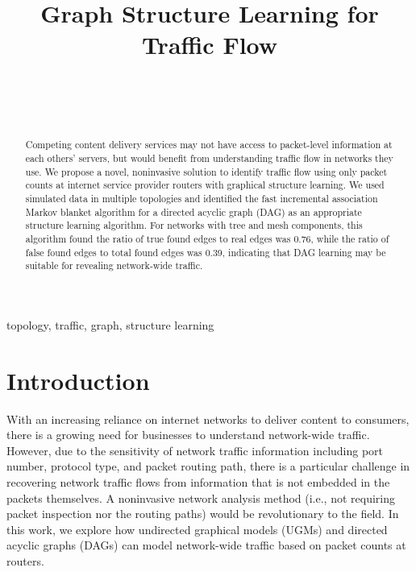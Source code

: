 \documentclass[conference]{IEEEtran}
\begin{document}
\title{Graph Structure Learning for Traffic Flow} 
\author{
\\[-9.0ex]
\and
{}
\\[-9.0ex]
}
\maketitle
\begin{abstract}
Competing content delivery services may not have access to packet-level information at each others' servers, but would benefit from understanding traffic flow in networks they use. We propose a novel, noninvasive solution to identify traffic flow using only packet counts at internet service provider routers with graphical structure learning. We used simulated data in multiple topologies and identified the fast incremental association Markov blanket algorithm for a directed acyclic graph (DAG) as an appropriate structure learning algorithm. For networks with tree and mesh components, this algorithm found the ratio of true found edges to real edges was 0.76, while the ratio of false found edges to total found edges was 0.39, indicating that DAG learning may be suitable for revealing network-wide traffic.

\end{abstract}

\begin{IEEEkeywords}
topology, traffic, graph, structure learning 
\end{IEEEkeywords}

\section{Introduction}
With an increasing reliance on internet networks to deliver content to consumers, there is a growing need for businesses to understand network-wide traffic. However, due to the sensitivity of network traffic information including port number, protocol type, and packet routing path, there is a particular challenge in recovering network traffic flows from information that is not embedded in the packets themselves. A noninvasive network analysis method (i.e., not requiring packet inspection nor the routing paths) would be revolutionary to the field. In this work, we explore how undirected graphical models (UGMs) and directed acyclic graphs (DAGs) can model network-wide traffic based on packet counts at routers.
\end{document}
